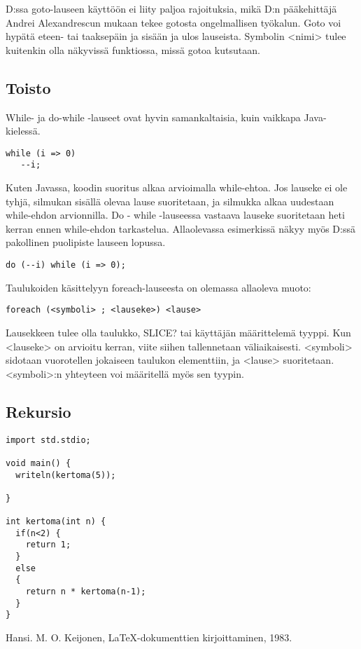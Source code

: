 \documentclass[11pt,oneside,a4paper]{article}
\begin{document}
D:ssa goto-lauseen käyttöön ei liity paljoa rajoituksia, mikä D:n pääkehittäjä
Andrei Alexandrescun mukaan tekee gotosta ongelmallisen työkalun. Goto voi
hypätä eteen- tai taaksepäin ja sisään ja ulos lauseista. Symbolin <nimi> tulee
kuitenkin olla näkyvissä funktiossa, missä gotoa kutsutaan. 


\subsection{Toisto}

While- ja do-while -lauseet ovat hyvin samankaltaisia, kuin vaikkapa
Java-kielessä. 

\begin{verbatim}
while (i => 0)
   --i;
\end{verbatim}

Kuten Javassa, koodin suoritus alkaa arvioimalla while-ehtoa. Jos lauseke ei ole
tyhjä, silmukan sisällä olevaa lause suoritetaan, ja silmukka alkaa uudestaan
while-ehdon arvionnilla. Do - while -lauseessa vastaava lauseke suoritetaan heti
kerran ennen while-ehdon tarkastelua. Allaolevassa esimerkissä näkyy myös D:ssä
pakollinen puolipiste lauseen lopussa.

\begin{verbatim}
do (--i) while (i => 0);
\end{verbatim}

Taulukoiden käsittelyyn foreach-lauseesta on olemassa allaoleva muoto:

\begin{verbatim}
foreach (<symboli> ; <lauseke>) <lause>
\end{verbatim}

Lausekkeen tulee olla taulukko, SLICE? tai käyttäjän määrittelemä tyyppi. Kun
<lauseke> on arvioitu kerran, viite siihen tallennetaan väliaikaisesti.
<symboli> sidotaan vuorotellen jokaiseen taulukon elementtiin, ja <lause>
suoritetaan. <symboli>:n yhteyteen voi määritellä myös sen tyypin. 

\subsection{Rekursio}

\begin{verbatim}
import std.stdio;

void main() {
  writeln(kertoma(5));

}

int kertoma(int n) {
  if(n<2) {
    return 1;
  }
  else
  {
    return n * kertoma(n-1);
  }
}
\end{verbatim}

%


\begin{thebibliography}{99}

 Hansi. M. O. Keijonen, LaTeX-dokumenttien kirjoittaminen, 1983.
\end{thebibliography}
\end{document}
